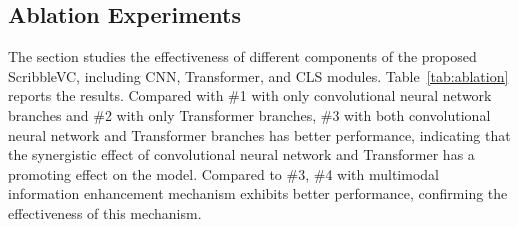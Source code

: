 \documentclass[sigconf,natbib=false]{acmart}
\begin{document}
\subsection{Ablation Experiments}
The section studies the effectiveness of different components of the proposed ScribbleVC, including CNN, Transformer, and CLS modules. Table~\ref{tab:ablation} reports the results.
Compared with \#1 with only convolutional neural network branches and \#2 with only Transformer branches, \#3 with both convolutional neural network and Transformer branches has better performance, indicating that the synergistic effect of convolutional neural network and Transformer has a promoting effect on the model. Compared to \#3, \#4 with multimodal information enhancement mechanism exhibits better performance, confirming the effectiveness of this mechanism.
\vspace{-2mm}
\begin{table}[ht!]\footnotesize
\setlength{\abovecaptionskip}{0mm}
  \centering
  \caption{Ablation study: ScribbleVC for image segmentation with different settings, including the CNN branch, the Transformer branch, and CLS module.} \label{tab:ablation}
  \vspace{-2mm}
\end{table}
\vspace{-4mm}
\end{document}
